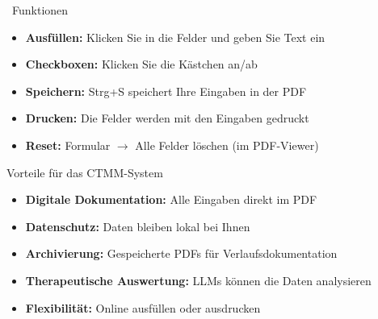 \vspace{1cm}

\begin{ctmmYellowBox}{\faInfoCircle~Funktionen}
\begin{itemize}
    \item \textbf{Ausfüllen:} Klicken Sie in die Felder und geben Sie Text ein
    \item \textbf{Checkboxen:} Klicken Sie die Kästchen an/ab
    \item \textbf{Speichern:} Strg+S speichert Ihre Eingaben in der PDF
    \item \textbf{Drucken:} Die Felder werden mit den Eingaben gedruckt
    \item \textbf{Reset:} Formular $\rightarrow$ Alle Felder löschen (im PDF-Viewer)
\end{itemize}
\end{ctmmYellowBox}

\vspace{1cm}

\begin{ctmmGreenBox}{Vorteile für das CTMM-System}
\begin{itemize}
    \item \textbf{Digitale Dokumentation:} Alle Eingaben direkt im PDF
    \item \textbf{Datenschutz:} Daten bleiben lokal bei Ihnen
    \item \textbf{Archivierung:} Gespeicherte PDFs für Verlaufsdokumentation
    \item \textbf{Therapeutische Auswertung:} LLMs können die Daten analysieren
    \item \textbf{Flexibilität:} Online ausfüllen oder ausdrucken
\end{itemize}
\end{ctmmGreenBox}
